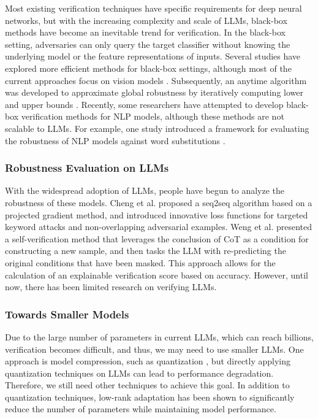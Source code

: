 \documentclass[conference]{IEEEtran}
\begin{document}
\par Most existing verification techniques have specific requirements for deep 
neural networks, but with the increasing complexity and scale of LLMs, black-box 
methods have become an inevitable trend for verification\cite{wicker2018feature,wu2020game,xu2022quantifying}.
In the black-box setting, adversaries can only query the target classifier 
without knowing the underlying model or the feature representations of inputs. 
Several studies have explored more efficient methods for black-box settings, 
although most of the current approaches focus on vision models \cite{wicker2018feature,wu2020game,xu2022quantifying}.
Subsequently, an anytime algorithm was developed to approximate global robustness 
by iteratively computing lower and upper bounds \cite{ruan2019global}. Recently, some researchers 
have attempted to develop black-box verification methods for NLP models, although 
these methods are not scalable to LLMs. For example, one study introduced a framework 
for evaluating the robustness of NLP models against word substitutions \cite{la2020assessing}.


\subsubsection*{Robustness Evaluation on LLMs}

\par With the widespread adoption of LLMs, people have begun to analyze the robustness 
of these models. Cheng et al. \cite{cheng2020seq2sick} proposed a seq2seq algorithm based on a projected 
gradient method, and introduced innovative loss functions for targeted keyword attacks 
and non-overlapping adversarial examples. Weng et al. \cite{weng2022large,weng2023neural} presented a 
self-verification method that leverages the conclusion of CoT as a condition for 
constructing a new sample, and then tasks the LLM with re-predicting the original 
conditions that have been masked. This approach allows for the calculation of an 
explainable verification score based on accuracy. However, until now, there has been 
limited research on verifying LLMs.

\subsubsection*{Towards Smaller Models}

\par Due to the large number of parameters in current LLMs, 
which can reach billions, verification becomes difficult, and thus, 
we may need to use smaller LLMs. One approach is model compression, 
such as quantization \cite{frantar2022optimal,feng2023survey,nagel2020up}, 
but directly applying quantization techniques 
on LLMs can lead to performance degradation. Therefore, we still need other 
techniques to achieve this goal\cite{yao2022zeroquant, park2022nuqmm,dettmers2022gpt3}. In addition to quantization 
techniques, low-rank adaptation \cite{hu2021lora} has been shown to significantly reduce the 
number of parameters while maintaining model performance.
\end{document}
